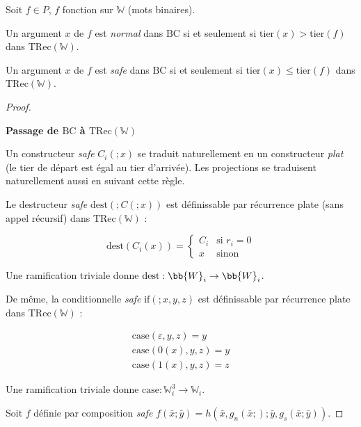 \documentclass{report}
\newcommand{\TRec}[1]{\text{TRec}\left(\mathbb{#1}\right)}
\begin{document}
			\begin{lemma}
				\label{lem:BC_and_Leivant}
				Soit $f \in P$, $f$ fonction sur $\mathbb{W}$ (mots binaires).
				
				Un argument $x$ de $f$ est \emph{normal} dans $\text{BC}$ si et seulement si $\text{tier}(x) > \text{tier}(f)$ dans $\TRec{W}$.
				
				Un argument $x$ de $f$ est \emph{safe} dans $\text{BC}$ si et seulement si $\text{tier}(x) \leq \text{tier}(f)$ dans $\TRec{W}$.
			\end{lemma}
			
			\begin{proof}
				\textcolor{white}{T} %
				
				\textbf{Passage de $\text{BC}$ à $\TRec{W}$}
				
				Un constructeur \emph{safe} $C_i(; x)$ se traduit naturellement en un constructeur \emph{plat} (le tier de départ est égal au tier d'arrivée). Les projections se traduisent naturellement aussi en suivant cette règle.
				
				Le destructeur \emph{safe} $\text{dest} \left( ; C\left(; x\right) \right)$ est définissable par récurrence plate (sans appel récursif) dans $\TRec{W}$ : 
				
				\[
					\text{dest} \left( C_i\left( x\right) \right) = 
					\left\lbrace \begin{array}{ll}
					C_i	& \text{si $r_i = 0$} \\
					x	& \text{sinon}
					\end{array} \right.
				\]
				
				Une ramification triviale donne $\text{dest} : \bb{W}_i \to \bb{W}_i$.
				
				De même, la conditionnelle \emph{safe} $\text{if} \left( ; x, y, z\right)$ est définissable par récurrence plate dans $\TRec{W}$ : 
				
				\[
					\begin{array}{l}
					\text{case}(\varepsilon, y, z) = y \\
					\text{case}(0(x), y, z) = y \\
					\text{case}(1(x), y, z) = z
					\end{array}
				\]
				
				Une ramification triviale donne $\text{case} : \mathbb{W}_i^3 \to \mathbb{W}_i$.
				
				Soit $f$ définie par composition \emph{safe} $f\left( \bar{x} ; \bar{y}\right) = h\left( \bar{x}, g_n( \bar{x}; ) ; \bar{y}, g_s( \bar{x}; \bar{y} ) \right)$.
				

\end{proof}
\end{document}
